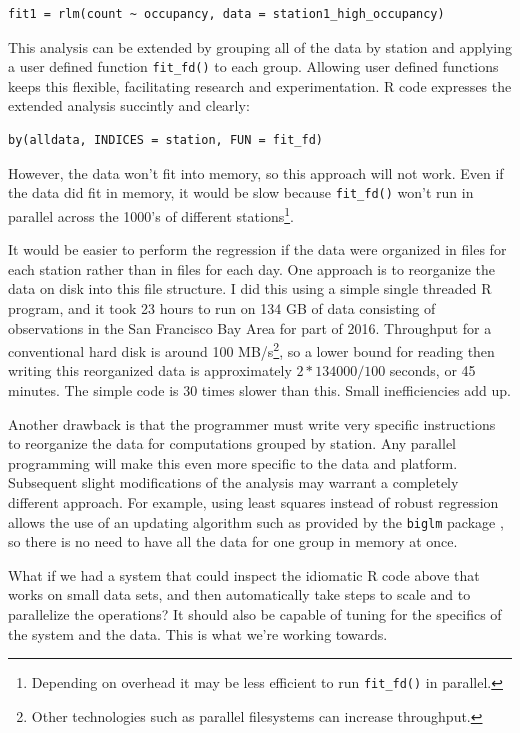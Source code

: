 \documentclass[12pt]{article}
\begin{document}
\begin{verbatim}
fit1 = rlm(count ~ occupancy, data = station1_high_occupancy)
\end{verbatim}

This analysis can be extended by grouping all of the data by station and
applying a user defined function \texttt{fit\_fd()} to each group.
Allowing user defined functions keeps this flexible, facilitating research
and experimentation. R code expresses the extended analysis succintly and
clearly:

\begin{verbatim}
by(alldata, INDICES = station, FUN = fit_fd)
\end{verbatim}

However, the data won't fit into memory, so this approach will not work.
Even if the data did fit in memory, it would be slow because \texttt{fit\_fd()} won't
run in parallel across the 1000's of different stations\footnote{
Depending on overhead it may be less efficient to run \texttt{fit\_fd()} in
parallel.}.

It would be easier to perform the regression if the data were
organized in files for each station rather than in files for each day.  One
approach is to reorganize the data on disk into this file structure. I
did this using a simple single threaded R program, and it took 23 hours to
run on 134 GB of data consisting of observations in the San Francisco Bay
Area for part of 2016.  Throughput for a conventional hard disk is around
100 MB/s\footnote{Other technologies such as parallel filesystems can
increase throughput.}, so a lower bound for reading then writing this
reorganized data is approximately $2 * 134000 / 100$ seconds, or 45
minutes. The simple code is 30 times slower than this. Small
inefficiencies add up.

Another drawback is that the programmer must write very specific
instructions to reorganize the data for computations grouped by station.
Any parallel programming will make this even more specific to the data and
platform. Subsequent slight modifications of the analysis may warrant a
completely different approach. For example, using least squares instead of
robust regression allows the use of an updating algorithm such as provided
by the \texttt{biglm} package \cite{R-biglm}, so there is no need to have
all the data for one group in memory at once.

What if we had a system that could inspect the idiomatic R code above that
works on small data sets, and then automatically take steps to scale and to
parallelize the operations? It should also be capable of tuning for the
specifics of the system and the data. This is what we're working towards.
\end{document}
